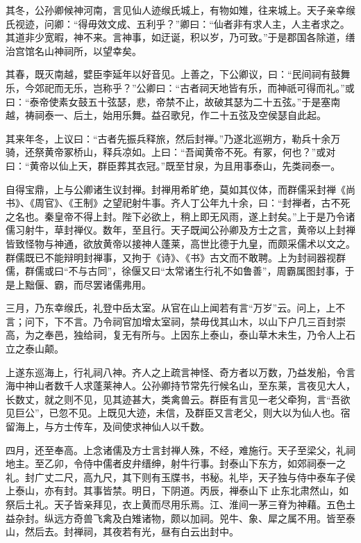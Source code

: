 \documentclass[12pt,UTF8]{ctexbook}
\begin{document}
其冬，公孙卿候神河南，言见仙人迹缑氏城上，有物如雉，往来城上。天子亲幸缑氏视迹，问卿：“得毋效文成、五利乎？”卿曰：“仙者非有求人主，人主者求之。其道非少宽暇，神不来。言神事，如迂诞，积以岁，乃可致。”于是郡国各除道，缮治宫馆名山神祠所，以望幸矣。



其春，既灭南越，嬖臣李延年以好音见。上善之，下公卿议，曰：“民间祠有鼓舞乐，今郊祀而无乐，岂称乎？”公卿曰：“古者祠天地皆有乐，而神祇可得而礼。”或曰：“泰帝使素女鼓五十弦瑟，悲，帝禁不止，故破其瑟为二十五弦。”于是塞南越，祷祠泰一、后土，始用乐舞。益召歌兒，作二十五弦及空侯瑟自此起。



其来年冬，上议曰：“古者先振兵释旅，然后封禅。”乃遂北巡朔方，勒兵十余万骑，还祭黄帝冢桥山，释兵凉如。上曰：“吾闻黄帝不死。有冢，何也？”或对曰：“黄帝以仙上天，群臣葬其衣冠。”既至甘泉，为且用事泰山，先类祠泰一。



自得宝鼎，上与公卿诸生议封禅。封禅用希旷绝，莫如其仪体，而群儒采封禅《尚书》、《周官》、《王制》之望祀射牛事。齐人丁公年九十余，曰：“封禅者，古不死之名也。秦皇帝不得上封。陛下必欲上，稍上即无风雨，遂上封矣。”上于是乃令诸儒习射牛，草封禅仪。数年，至且行。天子既闻公孙卿及方士之言，黄帝以上封禅皆致怪物与神通，欲放黄帝以接神人蓬莱，高世比德于九皇，而颇采儒术以文之。群儒既已不能辩明封禅事，又拘于《诗》、《书》古文而不敢聘。上为封祠器视群儒，群儒或曰“不与古同”，徐偃又曰“太常诸生行礼不如鲁善”，周霸属图封事，于是上黜偃、霸，而尽罢诸儒弗用。



三月，乃东幸缑氏，礼登中岳太室。从官在山上闻若有言“万岁”云。问上，上不言；问下，下不言。乃令祠官加增太室祠，禁毋伐其山木，以山下户几三百封崇高，为之奉邑，独给祠，复无有所与。上因东上泰山，泰山草木未生，乃令人上石立之泰山颠。



上遂东巡海上，行礼祠八神。齐人之上疏言神怪、奇方者以万数，乃益发船，令言海中神山者数千人求蓬莱神人。公孙卿持节常先行候名山，至东莱，言夜见大人，长数丈，就之则不见，见其迹甚大，类禽兽云。群臣有言见一老父牵狗，言“吾欲见巨公”，已忽不见。上既见大迹，未信，及群臣又言老父，则大以为仙人也。宿留海上，与方士传车，及间使求神仙人以千数。



四月，还至奉高。上念诸儒及方士言封禅人殊，不经，难施行。天子至梁父，礼祠地主。至乙卯，令侍中儒者皮弁缙绅，射牛行事。封泰山下东方，如郊祠泰一之礼。封广丈二尺，高九尺，其下则有玉牒书，书秘。礼毕，天子独与侍中泰车子侯上泰山，亦有封。其事皆禁。明日，下阴道。丙辰，禅泰山下止东北肃然山，如祭后土礼。天子皆亲拜见，衣上黄而尽用乐焉。江、淮间一茅三脊为神藉。五色土益杂封。纵远方奇兽飞禽及白雉诸物，颇以加祠。兕牛、象、犀之属不用。皆至泰山，然后去。封禅祠，其夜若有光，昼有白云出封中。
\end{document}
